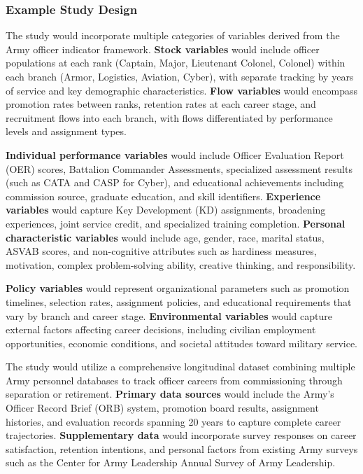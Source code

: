 \documentclass[main.tex]{subfiles}
\begin{document}
\subsubsection{Example Study Design}


The study would incorporate multiple categories of variables derived from the Army officer indicator framework. \textbf{Stock variables} would include officer populations at each rank (Captain, Major, Lieutenant Colonel, Colonel) within each branch (Armor, Logistics, Aviation, Cyber), with separate tracking by years of service and key demographic characteristics\parencite{army_indicators}. \textbf{Flow variables} would encompass promotion rates between ranks, retention rates at each career stage, and recruitment flows into each branch, with flows differentiated by performance levels and assignment types.

\textbf{Individual performance variables} would include Officer Evaluation Report (OER) scores, Battalion Commander Assessments, specialized assessment results (such as CATA and CASP for Cyber), and educational achievements including commission source, graduate education, and skill identifiers\parencite{army_indicators}. \textbf{Experience variables} would capture Key Development (KD) assignments, broadening experiences, joint service credit, and specialized training completion. \textbf{Personal characteristic variables} would include age, gender, race, marital status, ASVAB scores, and non-cognitive attributes such as hardiness measures, motivation, complex problem-solving ability, creative thinking, and responsibility\parencite{army_indicators}.

\textbf{Policy variables} would represent organizational parameters such as promotion timelines, selection rates, assignment policies, and educational requirements that vary by branch and career stage. \textbf{Environmental variables} would capture external factors affecting career decisions, including civilian employment opportunities, economic conditions, and societal attitudes toward military service.


The study would utilize a comprehensive longitudinal dataset combining multiple Army personnel databases to track officer careers from commissioning through separation or retirement. \textbf{Primary data sources} would include the Army's Officer Record Brief (ORB) system, promotion board results, assignment histories, and evaluation records spanning 20 years to capture complete career trajectories. \textbf{Supplementary data} would incorporate survey responses on career satisfaction, retention intentions, and personal factors from existing Army surveys such as the Center for Army Leadership Annual Survey of Army Leadership.
\end{document}
